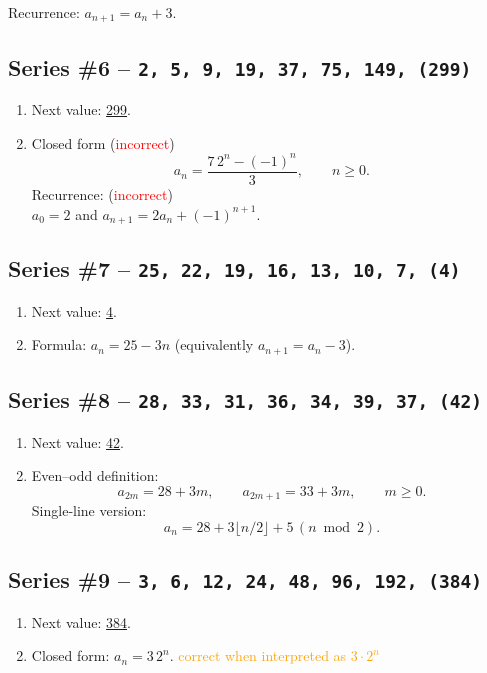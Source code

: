 \documentclass{sn-jnl}
\theoremstyle{definition}
\newcommand{\seq}[1]{\texttt{#1}}
\newcommand{\nextval}[1]{\underline{#1}}
\begin{document}
{\begin{enumerate}[label=(\alph*)]
  Recurrence: $a_{n+1}=a_n+3$.
\end{enumerate}

\subsection*{Series \#6 -- \seq{2,\,5,\,9,\,19,\,37,\,75,\,149,\,(299)}}
\begin{enumerate}[label=(\alph*)]
  \item Next value: \nextval{299}.
  \item Closed form (\textcolor{red}{incorrect})
  \[
    a_n=\frac{7\,2^{n}-(-1)^{n}}{3},\qquad n\ge0.
  \]
  Recurrence: (\textcolor{red}{incorrect}) \\
  $a_0=2$ and $a_{n+1}=2a_n+(-1)^{n+1}$.
\end{enumerate}

\subsection*{Series \#7 -- \seq{25,\,22,\,19,\,16,\,13,\,10,\,7,\,(4)}}
\begin{enumerate}[label=(\alph*)]
  \item Next value: \nextval{4}.
  \item Formula: $a_n = 25-3n$ \;(equivalently $a_{n+1}=a_n-3$).
\end{enumerate}

\subsection*{Series \#8 -- \seq{28,\,33,\,31,\,36,\,34,\,39,\,37,\,(42)}}
\begin{enumerate}[label=(\alph*)]
  \item Next value: \nextval{42}.
  \item Even--odd definition:
  \[
    a_{2m}=28+3m,\qquad a_{2m+1}=33+3m,\qquad m\ge0.
  \]
  Single‑line version:
  \[a_n = 28+3\lfloor n/2\rfloor+5\,(n\bmod 2).\]
\end{enumerate}

\subsection*{Series \#9 -- \seq{3,\,6,\,12,\,24,\,48,\,96,\,192,\,(384)}}
\begin{enumerate}[label=(\alph*)]
  \item Next value: \nextval{384}.
  \item Closed form: $a_n=3\,2^{n}$. \textcolor{orange}{ correct when interpreted as $3\cdot2^n$}
  

\end{enumerate}}
\end{document}

